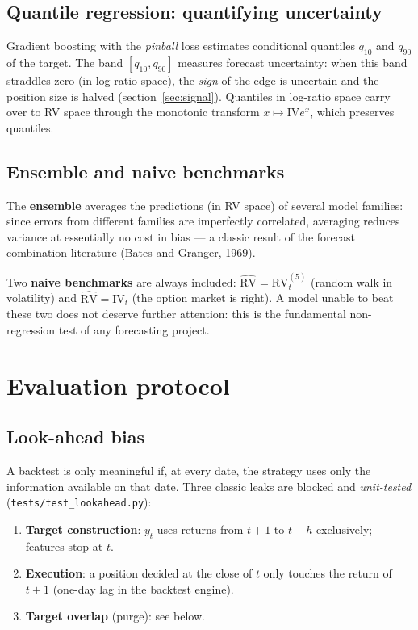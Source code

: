 \documentclass[11pt,a4paper]{article}
\newcommand{\RV}{\mathrm{RV}}
\newcommand{\IV}{\mathrm{IV}}
\begin{document}
\subsection{Quantile regression: quantifying uncertainty}

Gradient boosting with the \emph{pinball} loss estimates conditional
quantiles $q_{10}$ and $q_{90}$ of the target. The band $[q_{10}, q_{90}]$
measures forecast uncertainty: when this band straddles zero (in log-ratio
space), the \emph{sign} of the edge is uncertain and the position size is
halved (section~\ref{sec:signal}). Quantiles in log-ratio space carry over to
RV space through the monotonic transform $x \mapsto \IV e^{x}$, which
preserves quantiles.

\subsection{Ensemble and naive benchmarks}

The \textbf{ensemble} averages the predictions (in RV space) of several model
families: since errors from different families are imperfectly correlated,
averaging reduces variance at essentially no cost in bias --- a classic
result of the forecast combination literature (Bates and Granger, 1969).

Two \textbf{naive benchmarks} are always included:
$\widehat{\RV} = \RV_t^{(5)}$ (random walk in volatility) and
$\widehat{\RV} = \IV_t$ (the option market is right). A model unable to beat
these two does not deserve further attention: this is the fundamental
non-regression test of any forecasting project.

\section{Evaluation protocol}

\subsection{Look-ahead bias}

A backtest is only meaningful if, at every date, the strategy uses only the
information available on that date. Three classic leaks are blocked and
\emph{unit-tested} (\texttt{tests/test\_lookahead.py}):
\begin{enumerate}
\item \textbf{Target construction}: $y_t$ uses returns from $t+1$ to $t+h$
  exclusively; features stop at $t$.
\item \textbf{Execution}: a position decided at the close of $t$ only touches
  the return of $t+1$ (one-day lag in the backtest engine).
\item \textbf{Target overlap} (purge): see below.
\end{enumerate}
\end{document}
